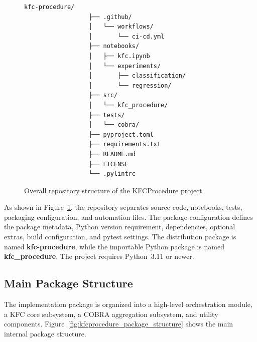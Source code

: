 \begin{figure}[H]
      \centering
      \begin{minipage}{0.85\textwidth}
            \begin{Verbatim}[fontsize=\footnotesize, baselinestretch=0.9]
                  kfc-procedure/
                  ├── .github/
                  │   └── workflows/
                  │       └── ci-cd.yml
                  ├── notebooks/
                  │   ├── kfc.ipynb
                  │   └── experiments/
                  │       ├── classification/
                  │       └── regression/
                  ├── src/
                  │   └── kfc_procedure/
                  ├── tests/
                  │   └── cobra/
                  ├── pyproject.toml
                  ├── requirements.txt
                  ├── README.md
                  ├── LICENSE
                  └── .pylintrc
            \end{Verbatim}
      \end{minipage}
      \caption{Overall repository structure of the KFCProcedure project}
      \label{fig:kfcprocedure_repository_structure}
\end{figure}

\hs As shown in Figure~\ref{fig:kfcprocedure_repository_structure}, the repository separates source code, notebooks, tests, packaging configuration, and automation files. The package configuration defines the package metadata, Python version requirement, dependencies, optional extras, build configuration, and pytest settings. The distribution package is named \textbf{kfc-procedure}, while the importable Python package is named \textbf{kfc\_procedure}. The project requires Python~3.11 or newer.

\subsection{Main Package Structure}

\hs The implementation package is organized into a high-level orchestration module, a KFC core subsystem, a COBRA aggregation subsystem, and utility components. Figure~\ref{fig:kfcprocedure_package_structure} shows the main internal package structure.

